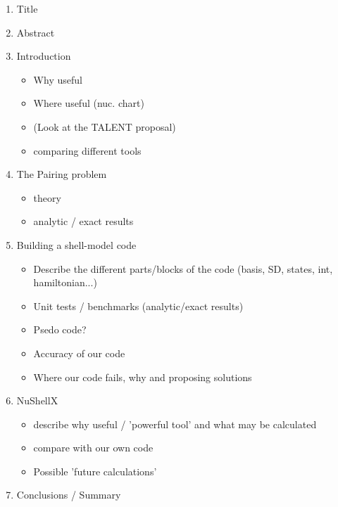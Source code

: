 \documentclass[twoside]{article}
\begin{document}
\begin{enumerate}
\item Title
\item Abstract
\item Introduction
\begin{itemize}
\item Why useful
\item Where useful (nuc. chart)
\item (Look at the TALENT proposal)
\item comparing different tools
\end{itemize}
\item The Pairing problem
\begin{itemize}
\item theory
\item analytic / exact results
\end{itemize}
\item Building a shell-model code
\begin{itemize}
\item Describe the different parts/blocks of the code (basis, SD, states, int, hamiltonian...)
\item Unit tests / benchmarks (analytic/exact results)
\item Psedo code?
\item Accuracy of our code
\item Where our code fails, why and proposing solutions
\end{itemize}
\item NuShellX
\begin{itemize}
\item describe why useful / 'powerful tool' and what may be calculated
\item compare with our own code
\item Possible 'future calculations'
\end{itemize}
\item Conclusions / Summary
\end{enumerate}

\end{document}
